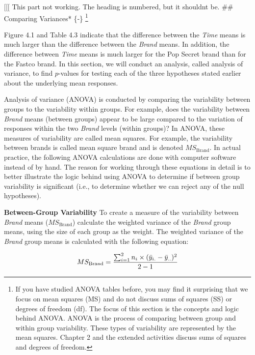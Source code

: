 \documentclass[
]{report}
\begin{document}
{[}{[}{[} This part not working. The heading is numbered, but it shouldnt be.
\#\# Comparing Variances* \{‑\} \footnote{If you have studied ANOVA tables before, you may find it surprising that we focus on mean squares (MS) and do not discuss sums of squares (SS) or degrees of freedom (df). The focus of this section is the concepts and logic behind ANOVA. ANOVA is the process of comparing between group and within group variability. These types of variability are represented by the mean squares. Chapter 2 and the extended activities discuss sums of squares and degrees of freedom.}

Figure 4.1 and Table 4.3 indicate that the difference between the \emph{Time} means is much larger than the difference between the \emph{Brand} means. In addition, the difference between \emph{Time} means is much larger for the Pop Secret brand than for the Fastco brand. In this section, we will conduct an analysis, called analysis of variance, to find \(p\)-values for testing each of the three hypotheses stated earlier about the underlying mean responses.

Analysis of variance (ANOVA) is conducted by comparing the variability between groups to the variability within groups. For example, does the variability between \emph{Brand} means (between groups) appear to be large compared to the variation of responses within the two \emph{Brand} levels (within groups)? In ANOVA, these measures of variability are called mean squares. For example, the variability between brands is called mean square brand and is denoted \(MS_{\text{Brand}}\). In actual practice, the following ANOVA calculations are done with computer software instead of by hand. The reason for working through these equations in detail is to better illustrate the logic behind using ANOVA to determine if between group variability is significant (i.e., to determine whether we can reject any of the null hypotheses).

\textbf{Between-Group Variability} To create a measure of the variability between \emph{Brand} means (\(MS_{\text{Brand}}\)) calculate the weighted variance of the \emph{Brand} group means, using the size of each group as the weight. The weighted variance of the \emph{Brand} group means is calculated with the following equation:

\begin{align}
MS_{\text{Brand}} = \frac{\sum_{i=1}^{2} n_i \times (\bar{y}_{i.} - \bar{y}_{..})^2}{2-1}
\notag
\end{align}
\end{document}
